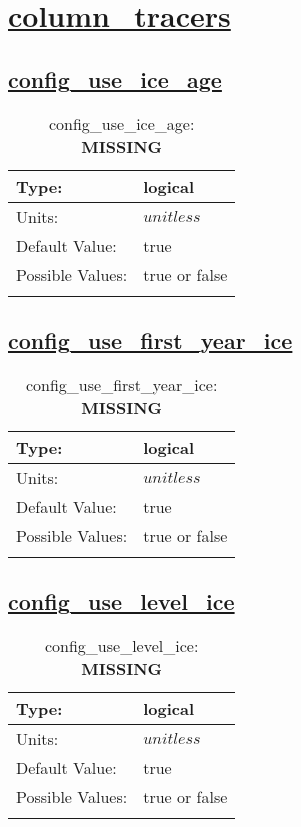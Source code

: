\section[column\_tracers]{\hyperref[sec:nm_tab_column_tracers]{column\_tracers}}
\label{sec:nm_sec_column_tracers}
\subsection[config\_use\_ice\_age]{\hyperref[sec:nm_tab_column_tracers]{config\_use\_ice\_age}}
\label{subsec:nm_sec_config_use_ice_age}
\begin{center}
\begin{longtable}{| p{2.0in} || p{4.0in} |}
    \hline
    Type: & logical \\
    \hline
    Units: & $unitless$ \\
    \hline
    Default Value: & true \\
    \hline
    Possible Values: & true or false \\
    \hline
    \caption{config\_use\_ice\_age: {\bf \color{red} MISSING}}
\end{longtable}
\end{center}
\subsection[config\_use\_first\_year\_ice]{\hyperref[sec:nm_tab_column_tracers]{config\_use\_first\_year\_ice}}
\label{subsec:nm_sec_config_use_first_year_ice}
\begin{center}
\begin{longtable}{| p{2.0in} || p{4.0in} |}
    \hline
    Type: & logical \\
    \hline
    Units: & $unitless$ \\
    \hline
    Default Value: & true \\
    \hline
    Possible Values: & true or false \\
    \hline
    \caption{config\_use\_first\_year\_ice: {\bf \color{red} MISSING}}
\end{longtable}
\end{center}
\subsection[config\_use\_level\_ice]{\hyperref[sec:nm_tab_column_tracers]{config\_use\_level\_ice}}
\label{subsec:nm_sec_config_use_level_ice}
\begin{center}
\begin{longtable}{| p{2.0in} || p{4.0in} |}
    \hline
    Type: & logical \\
    \hline
    Units: & $unitless$ \\
    \hline
    Default Value: & true \\
    \hline
    Possible Values: & true or false \\
    \hline
    \caption{config\_use\_level\_ice: {\bf \color{red} MISSING}}
\end{longtable}
\end{center}
